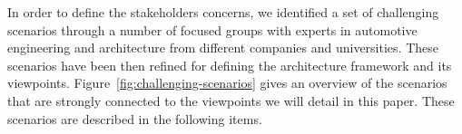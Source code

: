 In order to define the stakeholders concerns, we identified a set of challenging scenarios
through a number of focused groups with experts in automotive engineering and architecture from different companies and universities. 
These scenarios have been then refined %
for defining the architecture framework and its viewpoints. 
Figure~\ref{fig:challenging-scenarios} gives an overview of the scenarios that are strongly connected to the viewpoints we will detail in this paper. These scenarios are described in the following items.

